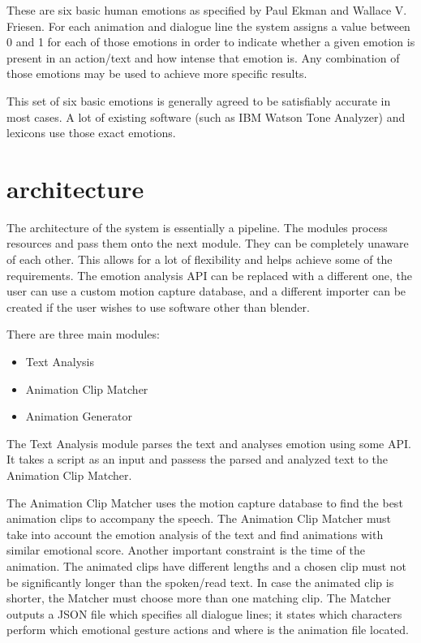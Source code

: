 These are six basic human emotions as specified by Paul Ekman and Wallace V. Friesen. For each animation and dialogue line the system assigns a value between 0 and 1 for each of those emotions in order to indicate whether a given emotion is present in an action/text and how intense that emotion is. Any combination of those emotions may be used to achieve more specific results.

This set of six basic emotions is generally agreed to be satisfiably accurate in most cases. A lot of existing software (such as IBM Watson Tone Analyzer) and lexicons use those exact emotions.


\section{architecture}

The architecture of the system is essentially a pipeline. The modules process resources and pass them onto the next module. They can be completely unaware of each other. This allows for a lot of flexibility and helps achieve some of the requirements. The emotion analysis API can be replaced with a different one, the user can use a custom motion capture database, and a different importer can be created if the user wishes to use software other than blender.


There are three main modules:
\begin{itemize}
\item Text Analysis
\item Animation Clip Matcher
\item Animation Generator
\end{itemize}

The Text Analysis module parses the text and analyses emotion using some API. It takes a script as an input and passess the parsed and analyzed text to the Animation Clip Matcher.

The Animation Clip Matcher uses the motion capture database to find the best animation clips to accompany the speech. The Animation Clip Matcher must take into account the emotion analysis of the text and find animations with similar emotional score. Another important constraint is the time of the animation. The animated clips have different lengths and a chosen clip must not be significantly longer than the spoken/read text. In case the animated clip is shorter, the Matcher must choose more than one matching clip. The Matcher outputs a JSON file which specifies all dialogue lines; it states which characters perform which emotional gesture actions and where is the animation file located.


